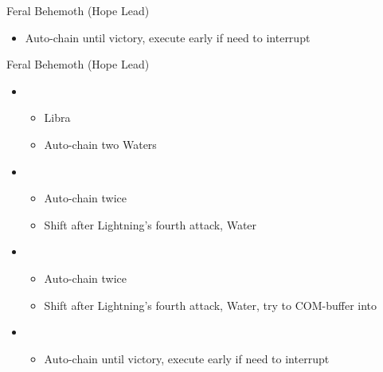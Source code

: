 \begin{paracol}{2}
\begin{battle}{Feral Behemoth (Hope Lead)}
\begin{itemize}
			      \begin{itemize}
				      \item Auto-chain until victory, execute early if need to interrupt
			      \end{itemize}
		\end{itemize}
	\end{battle}
	\switchcolumn
	\begin{battle}{Feral Behemoth (Hope Lead)}
		\begin{itemize}
			\item \first
			      \begin{itemize}
				      \item Libra
				      \item Auto-chain two Waters
			      \end{itemize}
			\item \fourth
			      \begin{itemize}
				      \item Auto-chain twice
				      \item Shift after Lightning's fourth attack, Water
			      \end{itemize}
			\item \fifth
			      \begin{itemize}
				      \item Auto-chain twice
				      \item Shift after Lightning's fourth attack, Water, try to COM-buffer into
			      \end{itemize}
			\item \first
			      \begin{itemize}
				      \item Auto-chain until victory, execute early if need to interrupt
			      \end{itemize}
		\end{itemize}
	\end{battle}
	\switchcolumn*


\end{paracol}

